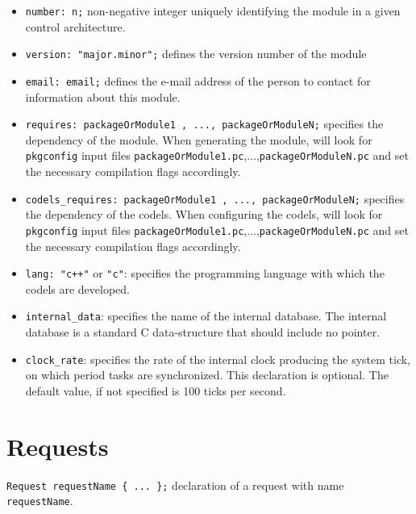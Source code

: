 \begin{itemize}
\item[]\texttt{number:  n;} non-negative integer uniquely identifying the module in
a given control architecture.

\item[]\texttt{version:  "major.minor";} defines the version number of the
module

\item[]\texttt{email:  email;} defines the e-mail address of
the person to contact for information about this module.

\item[]\texttt{requires:  packageOrModule1 , ..., packageOrModuleN;}
specifies the dependency of the module. When generating the module,
{\GenoM} will look for \texttt{pkgconfig} input files
\texttt{packageOrModule1.pc},...,\texttt{packageOrModuleN.pc} and set
the necessary compilation flags accordingly.

\item[]\texttt{codels\_requires:  packageOrModule1 , ..., packageOrModuleN;}
specifies the dependency of the codels. When configuring the codels,
{\GenoM} will look for \texttt{pkgconfig} input files
\texttt{packageOrModule1.pc},...,\texttt{packageOrModuleN.pc} and set
the necessary compilation flags accordingly.

\item[]\texttt{lang:  "c++"} or \texttt{"c"}: specifies the programming
language with which the codels are developed.

\item[]\texttt{internal\_data}: specifies the name of the internal database.
The internal database is a standard C data-structure that should
include no pointer.

\item[]\texttt{clock\_rate}: specifies the rate of the internal clock
producing the system tick, on which period tasks are synchronized.
This declaration is optional. The default value, if not specified is
100 ticks per second.
\end{itemize}

\section{Requests}
\label{sec|requests}

\texttt{Request requestName \{ ... \};} declaration of a request with
name \texttt{requestName}.\\

